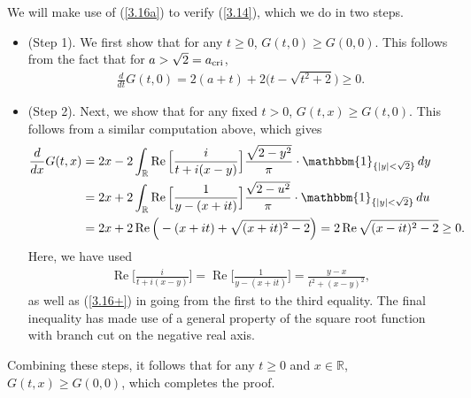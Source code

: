 \documentclass[10pt]{amsart}
\def\R{\mathbb{R}}
\newcommand{\re}{\operatorname{Re}}
\theoremstyle{plain}
\theoremstyle{remark}
\numberwithin{equation}{section}
\begin{document}
We will make use of (\ref{3.16a}) to verify (\ref{3.14}), which
we do in two steps.
\begin{itemize}
    \item (Step 1). We first show that for any $t \ge 0$, $G(t,0) \ge G(0,0)$. This follows from the fact that for $a>\sqrt{2} = a_{\rm cri}$,
    \begin{align*}
\frac{d}{dt} G(t,0)  = 2(a+t) +2  \Big( t-  \sqrt{ t^2+2 } \Big) \ge 0.  
\end{align*}
   \item (Step 2). Next, we show that for any fixed $t>0$, $G(t,x) \ge G(t,0)$. This follows from a similar computation above, which gives
   \begin{align*}
 \frac{d}{dx} G(t,x) &= 2x - 2 \int_{ \R } \re\Big[ \frac{i}{ t+i(x-y) }\Big] \frac{\sqrt{2-y^2}}{ \pi }\cdot \mathbbm{1}_{ \{ |y|<\sqrt{ 2 } \} } \,dy
 \\
 &= 2x + 2 \int_{ \R } \re \Big[ \frac{1}{y-(x+it)} \Big] \frac{ \sqrt{2-u^2} }{\pi}\cdot \mathbbm{1}_{ \{ |y|<\sqrt{ 2 } \} } \,du  
 \\
 &= 2x + 2 \re  \Big( -(x+it)+\sqrt{ (x+it)^2-2 } \Big)  =  2 \re  \sqrt{ (x-it)^2-2 } \ge 0 .  
   \end{align*}
   Here, we have used 
   \begin{align*}
    \re\Big[ \frac{i}{ t+i(x-y) }\Big] =  \re \Big[ \frac{1}{y-(x+it)} \Big] = \frac{y-x}{t^2+(x-y)^2},  
   \end{align*}
   as well as (\ref{3.16+}) in going from the first to the third
   equality. The final inequality has made use of a general property of the square root function with branch cut on the negative real axis.
\end{itemize}
Combining these steps, it follows that for any $t \ge 0$ and $x \in \R$, $G(t,x)\ge G(0,0)$, which completes the proof. 
\end{document}
